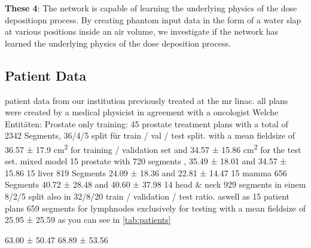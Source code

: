 \begin{hangingpar}
    \item\textbf{These 4}: The network is capable of learning the underlying physics of the dose depositiopn process. By creating phantom input data in the form of a water slap at various positions inside an air volume, we investigate if the network has learned the underlying physics of the dose deposition process.
\end{hangingpar}

\subsection{Patient Data}

patient data from our institution previously treated at the mr linac. all plans were created by a medical physicist in agreement with a oncologist
Welche Entitäten: Prostate only training: 45 prostate treatment plans with a total of 2342 Segments, 36/4/5 split für train / val / test split. with a mean fieldsize of 36.57 ± 17.9 cm\textsuperscript{2} for training / validation set and 34.57 ± 15.86 cm\textsuperscript{2} for the test set.
mixed model 15 prostate with 720 segments , 35.49 ± 18.01 and 34.57 ± 15.86 15 liver 819 Segments 24.09 ± 18.36 and 22.81 ± 14.47 15 mamma 656 Segments 40.72 ± 28.48 and 40.60 ± 37.98 14 head \& neck 929 segments in einem 8/2/5 split also in 32/8/20 train / validation / test ratio. aswell as 15 patient plans 659 segments for lymphnodes exclusively for testing with a mean fieldsize of 25.95 ± 25.59
as you can see in \autoref{tab:patients}

63.00 ± 50.47
68.89 ± 53.56

